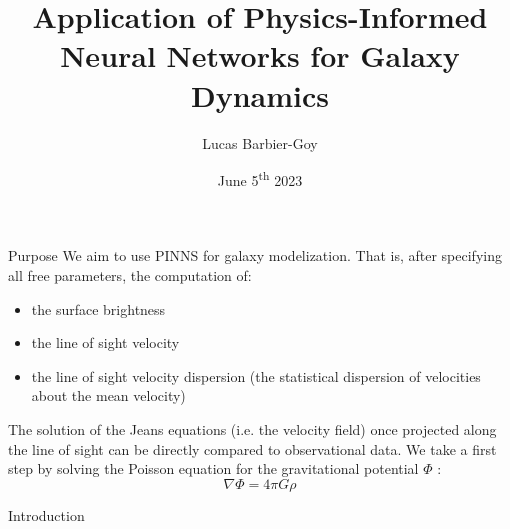 \documentclass[12pt, aspectratio=169]{beamer}
\title{Application of Physics-Informed Neural Networks for Galaxy Dynamics}
\author{Lucas Barbier-Goy}
\date{June 5\textsuperscript{th} 2023}
\begin{document}
\maketitle



\begin{frame}{Purpose}
    We aim to use PINNS for galaxy modelization. That is, after specifying all free parameters, the computation of:
    \begin{itemize}
        \item the surface brightness
        \item the line of sight velocity
        \item the line of sight velocity dispersion (the statistical dispersion of velocities about the mean velocity)
    \end{itemize}
    The solution of the Jeans equations (i.e. the velocity field) once projected along the line of sight can be directly compared to observational data. We take a first step by solving the Poisson equation for the gravitational potential $\Phi$ :
    $$ \nabla \Phi = 4 \pi G \rho $$
\end{frame}

\begin{frame}{Introduction}
    \tableofcontents
\end{frame}



\end{document}
